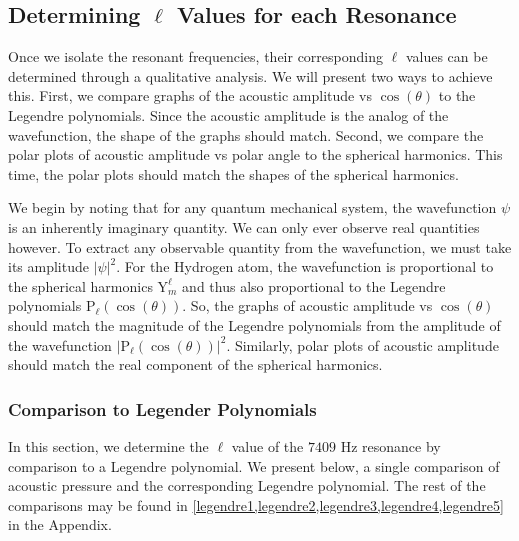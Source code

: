 \documentclass[12pt]{article}
\newcommand{\Ylm}[2]{\mathrm{Y}^{#1}_{#2}} %
\begin{document}
	
		
	
	\subsection{Determining $\ell$ Values for each Resonance}
	
	Once we isolate the resonant frequencies, their corresponding $\ell$ values can be determined through a qualitative analysis. We will present two ways to achieve this. First, we compare graphs of the acoustic amplitude vs $\cos(\theta)$ to the Legendre polynomials. Since the acoustic amplitude is the analog of the wavefunction, the shape of the graphs should match. Second, we compare the polar plots of acoustic amplitude vs polar angle to the spherical harmonics. This time, the polar plots should match the shapes of the spherical harmonics.
	
	We begin by noting that for any quantum mechanical system, the wavefunction $\psi$ is an inherently imaginary quantity. We can only ever observe real quantities however. To extract any observable quantity from the wavefunction, we must take its amplitude $|\psi|^2$. For the Hydrogen atom, the wavefunction is proportional to the spherical harmonics $\Ylm{\ell}{m}$ and thus also proportional to the Legendre polynomials $\mathrm{P}_\ell(\cos(\theta))$. So, the graphs of acoustic amplitude vs $\cos(\theta)$ should match the magnitude of the Legendre polynomials from the amplitude of the wavefunction $|\mathrm{P}_\ell(\cos(\theta))|^2$. Similarly, polar plots of acoustic amplitude should match the real component of the spherical harmonics.
	

	\subsubsection{Comparison to Legender Polynomials}
	In this section, we determine the $\ell$ value of the $7409$ Hz resonance by comparison to a Legendre polynomial. We present below, a single comparison of acoustic pressure and the corresponding Legendre polynomial. The rest of the comparisons may be found in \cref{legendre1,legendre2,legendre3,legendre4,legendre5} in the Appendix.
	
\end{document}
